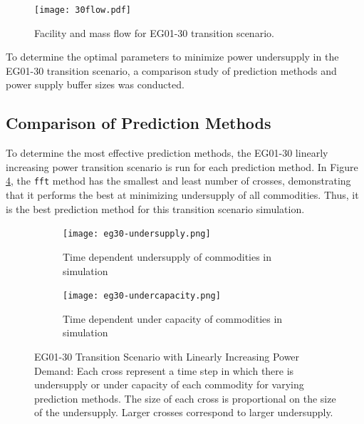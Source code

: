\begin{figure}[]
    \centering
    \texttt{[image: 30flow.pdf]} 
    \caption{Facility and mass flow for EG01-30 transition scenario.}
    \label{fig:30flow}
\end{figure}

To determine the optimal \deploy parameters to minimize 
power undersupply in the EG01-30 \Cyclus 
transition scenario, a comparison study of prediction 
methods and power supply buffer sizes was conducted. 

\subsection{Comparison of Prediction Methods}
To determine the most effective \deploy prediction methods, the
EG01-30 linearly increasing power transition scenario is run 
for each prediction method.  
In Figure \ref{fig:eg30under}, the \texttt{fft} method has
the smallest and least number of crosses, 
demonstrating that it performs the best at minimizing 
undersupply of all commodities.
Thus, it is the best prediction method for this transition 
scenario simulation. 

\begin{figure}[]
	\centering
	\begin{subfigure}[t]{1\textwidth}
		\centering
		\texttt{[image: eg30-undersupply.png]} 
		\caption{Time dependent undersupply of commodities in simulation }
		\label{fig:30undersupply}
	\end{subfigure}
	\vspace{1cm}
	\begin{subfigure}[t]{1\textwidth}
		\centering
		\texttt{[image: eg30-undercapacity.png]} 
		\caption{Time dependent under capacity of commodities in simulation }
		\label{fig:30undercapacity}
	\end{subfigure}
	\hfill
	\caption{
	EG01-30 Transition Scenario with Linearly Increasing Power Demand:
	Each cross represent a time step in which there is undersupply 
	or under capacity of each commodity for varying prediction methods. 
    The size of each cross is proportional on the size of the undersupply.
    Larger crosses correspond to larger undersupply.}
	\label{fig:eg30under}
\end{figure}

